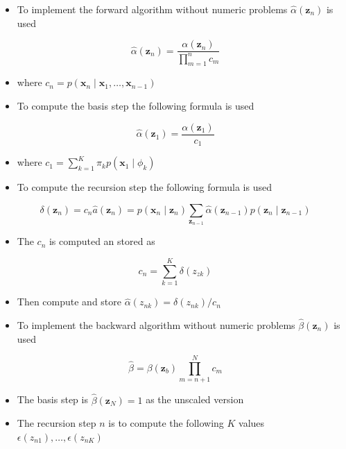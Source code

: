 \documentclass[11pt]{article}
\begin{document}
\begin{itemize}
\item To implement the forward algorithm without numeric problems \(\hat \alpha (\pmb z_n)\) is used
\end{itemize}
\begin{equation}
	\hat \alpha (\pmb z_n) = \frac{\alpha (\pmb z_n)}{\prod_{m=1}^n c_m}
\end{equation}
\begin{itemize}
\item where \(c_n = p (\pmb x_n \mid \pmb x_1, \dots, \pmb x_{n-1})\)

\item To compute the basis step the following formula is used
\end{itemize}
\begin{equation}
  \hat \alpha (\pmb z_1) = \frac{\alpha(\pmb z_1)}{c_1}
\end{equation}
\begin{itemize}
\item where \(c_1 = \sum_{k=1}^{K} \pi_k p(\pmb x_1 \mid \phi_k)\)

\item To compute the recursion step the following formula is used
\end{itemize}
\begin{equation}
  \delta (\pmb z_{n}) = c_n \hat a (\pmb z_{n}) = p(\pmb x_n \mid \pmb z_n) \sum_{\pmb z_{n-1}} \hat \alpha (\pmb z_{n-1}) p(\pmb z_n \mid \pmb z_{n-1})
\end{equation}
\begin{itemize}
\item The \(c_n\) is computed an stored as
\end{itemize}
\begin{equation}
	c_n = \sum_{k=1}^K \delta (z_{zk})
\end{equation}
\begin{itemize}
\item Then compute and store \(\hat \alpha(z_{nk}) = \delta(z_{nk})/c_n\)

\item To implement the backward algorithm without numeric problems \(\hat \beta (\pmb z_n)\) is used
\end{itemize}
\begin{equation}
  \hat \beta = {\beta(\pmb z_b)}{\prod_{m=n+1}^N c_m}
\end{equation}
\begin{itemize}
\item The basis step is \(\hat \beta (\pmb z_N) = 1\) as the unscaled version
\item The recursion step \(n\) is to compute the following \(K\) values \(\epsilon(z_{n1}), \dots, \epsilon(z_{nK})\)
\end{itemize}
\end{document}
